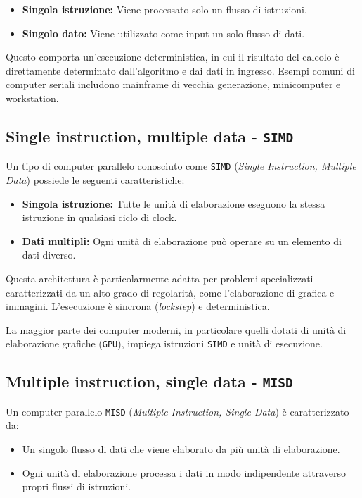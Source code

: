 \begin{itemize}
    \item \textbf{Singola istruzione:} Viene processato solo un flusso di istruzioni.
    \item \textbf{Singolo dato:} Viene utilizzato come input un solo flusso di dati.
\end{itemize}

Questo comporta un'esecuzione deterministica, in cui il risultato del calcolo
è direttamente determinato dall'algoritmo e dai dati in ingresso. Esempi comuni
di computer seriali includono mainframe di vecchia generazione, minicomputer
e workstation.

\subsection{Single instruction, multiple data - \texttt{SIMD}}
Un tipo di computer parallelo conosciuto come \texttt{SIMD} (\textit{Single Instruction, 
Multiple Data}) possiede le seguenti caratteristiche:

\begin{itemize}
    \item \textbf{Singola istruzione:} Tutte le unità di elaborazione
    eseguono la stessa istruzione in qualsiasi ciclo di clock.
    \item \textbf{Dati multipli:} Ogni unità di elaborazione può operare
    su un elemento di dati diverso.
\end{itemize}

Questa architettura è particolarmente adatta per problemi specializzati
caratterizzati da un alto grado di regolarità, come l'elaborazione di grafica
e immagini. L'esecuzione è sincrona (\textit{lockstep}) e deterministica.

La maggior parte dei computer moderni, in particolare quelli dotati di unità
di elaborazione grafiche (\texttt{GPU}), impiega istruzioni \texttt{SIMD} e
unità di esecuzione.

\subsection{Multiple instruction, single data - \texttt{MISD}}
Un computer parallelo \texttt{MISD} (\textit{Multiple Instruction, Single Data})
è caratterizzato da:

\begin{itemize}
    \item Un singolo flusso di dati che viene elaborato da più unità di elaborazione.
    \item Ogni unità di elaborazione processa i dati in modo indipendente
    attraverso propri flussi di istruzioni.
\end{itemize}

